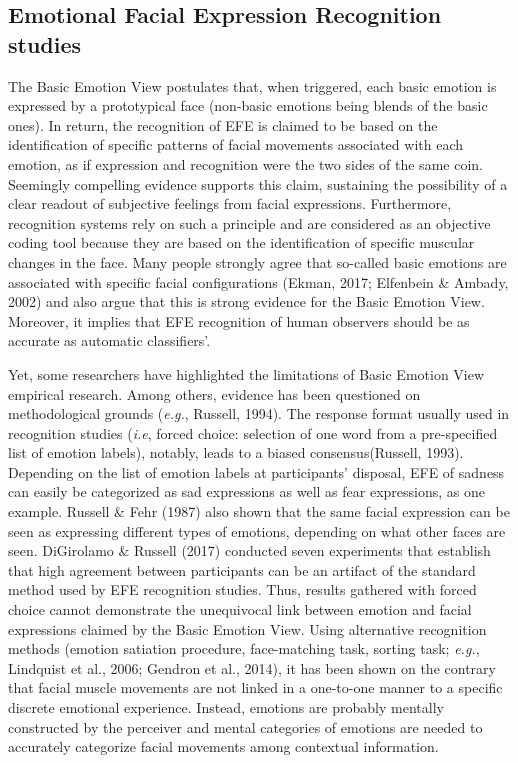 \documentclass[
  english,
  doc]{apa7}
\begin{document}
\hypertarget{emotional-facial-expression-recognition-studies}{%
\subsection{Emotional Facial Expression Recognition studies}\label{emotional-facial-expression-recognition-studies}}

The Basic Emotion View postulates that, when triggered, each basic emotion is expressed by a prototypical face (non-basic emotions being blends of the basic ones). In return, the recognition of EFE is claimed to be based on the identification of specific patterns of facial movements associated with each emotion, as if expression and recognition were the two sides of the same coin. Seemingly compelling evidence supports this claim, sustaining the possibility of a clear readout of subjective feelings from facial expressions. Furthermore, recognition systems rely on such a principle and are considered as an objective coding tool because they are based on the identification of specific muscular changes in the face. Many people strongly agree that so-called basic emotions are associated with specific facial configurations (Ekman, 2017; Elfenbein \& Ambady, 2002) and also argue that this is strong evidence for the Basic Emotion View. Moreover, it implies that EFE recognition of human observers should be as accurate as automatic classifiers'.

Yet, some researchers have highlighted the limitations of Basic Emotion View empirical research. Among others, evidence has been questioned on methodological grounds (\emph{e.g.}, Russell, 1994). The response format usually used in recognition studies (\emph{i.e}, forced choice: selection of one word from a pre-specified list of emotion labels), notably, leads to a biased consensus(Russell, 1993). Depending on the list of emotion labels at participants' disposal, EFE of sadness can easily be categorized as sad expressions as well as fear expressions, as one example. Russell \& Fehr (1987) also shown that the same facial expression can be seen as expressing different types of emotions, depending on what other faces are seen. DiGirolamo \& Russell (2017) conducted seven experiments that establish that high agreement between participants can be an artifact of the standard method used by EFE recognition studies. Thus, results gathered with forced choice cannot demonstrate the unequivocal link between emotion and facial expressions claimed by the Basic Emotion View. Using alternative recognition methods (emotion satiation procedure, face-matching task, sorting task; \emph{e.g.}, Lindquist et al., 2006; Gendron et al., 2014), it has been shown on the contrary that facial muscle movements are not linked in a one-to-one manner to a specific discrete emotional experience. Instead, emotions are probably mentally constructed by the perceiver and mental categories of emotions are needed to accurately categorize facial movements among contextual information.
\end{document}
